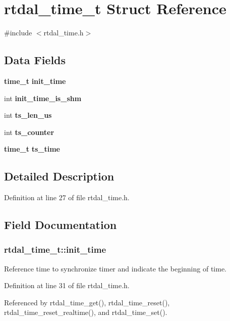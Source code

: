 \section{rtdal\-\_\-time\-\_\-t Struct Reference}
\label{structrtdal__time__t}


{\ttfamily \#include $<$rtdal\-\_\-time.\-h$>$}

\subsection*{Data Fields}
\begin{DoxyCompactItemize}
\item 
{\bf time\-\_\-t} {\bf init\-\_\-time}
\item 
int {\bf init\-\_\-time\-\_\-is\-\_\-shm}
\item 
int {\bf ts\-\_\-len\-\_\-us}
\item 
int {\bf ts\-\_\-counter}
\item 
{\bf time\-\_\-t} {\bf ts\-\_\-time}
\end{DoxyCompactItemize}


\subsection{Detailed Description}


Definition at line 27 of file rtdal\-\_\-time.\-h.



\subsection{Field Documentation}
\subsubsection[{init\-\_\-time}]{ rtdal\-\_\-time\-\_\-t\-::init\-\_\-time}\label{structrtdal__time__t_a30d11b555cefce5c8982f5d759d8d0b5}
Reference time to synchronize timer and indicate the beginning of time. 

Definition at line 31 of file rtdal\-\_\-time.\-h.



Referenced by rtdal\-\_\-time\-\_\-get(), rtdal\-\_\-time\-\_\-reset(), rtdal\-\_\-time\-\_\-reset\-\_\-realtime(), and rtdal\-\_\-time\-\_\-set().

